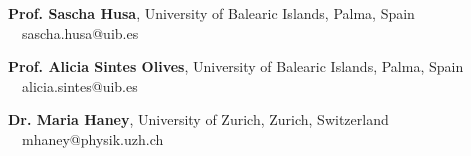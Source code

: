 \begin{cvpubs}
  \cvpub
    {
      \begin{cvlist}
        \item {\textbf{Prof. Sascha Husa}, University of Balearic Islands, Palma, Spain \hspace{1ex} \faEnvelope\ \ sascha.husa@uib.es}
        \item {\textbf{Prof. Alicia Sintes Olives}, University of Balearic Islands, Palma, Spain \hspace{1ex} \faEnvelope\ \ alicia.sintes@uib.es}
        \item {\textbf{Dr. Maria Haney}, University of Zurich, Zurich, Switzerland \hspace{1ex} \faEnvelope\ \ mhaney@physik.uzh.ch}
      \end{cvlist}
    }
\end{cvpubs}